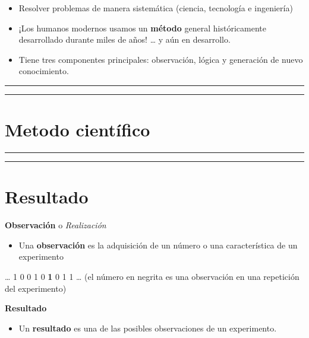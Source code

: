 \documentclass[
]{book}
\providecommand{\tightlist}{%
  \setlength{\itemsep}{0pt}\setlength{\parskip}{0pt}}
\begin{document}
\begin{itemize}
\item
  Resolver problemas de manera sistemática (ciencia, tecnología e ingeniería)
\item
  ¡Los humanos modernos usamos un \textbf{método} general históricamente desarrollado durante miles de años! \ldots{} y aún en desarrollo.
\item
  Tiene tres componentes principales: observación, lógica y generación de nuevo conocimiento.
\end{itemize}

\begin{center}\rule{0.5\linewidth}{0.5pt}\end{center}

\begin{center}\rule{0.5\linewidth}{0.5pt}\end{center}

\hypertarget{metodo-cientuxedfico}{%
\section{Metodo científico}\label{metodo-cientuxedfico}}

\begin{center}\rule{0.5\linewidth}{0.5pt}\end{center}

\begin{center}\rule{0.5\linewidth}{0.5pt}\end{center}

\hypertarget{resultado}{%
\section{Resultado}\label{resultado}}

\textbf{Observación} o \emph{Realización}

\begin{itemize}
\tightlist
\item
  Una \textbf{observación} es la adquisición de un número o una característica de un experimento
\end{itemize}

\ldots{} 1 0 0 1 0 \textbf{1} 0 1 1 \ldots{} (el número en negrita es una observación en una repetición del experimento)

\textbf{Resultado}

\begin{itemize}
\tightlist
\item
  Un \textbf{resultado} es una de las posibles observaciones de un experimento.
\end{itemize}
\end{document}
